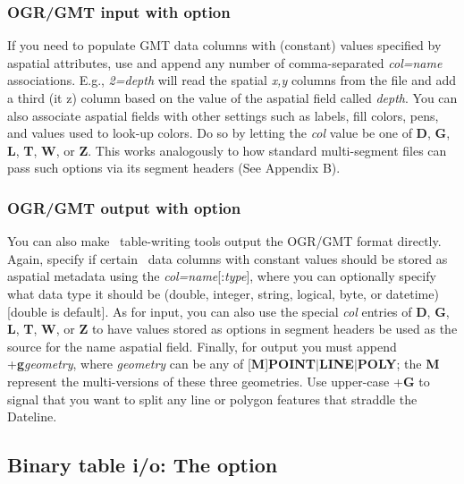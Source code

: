 \subsubsection{OGR/GMT input with  option}
If you need to populate GMT data columns with (constant) values specified by aspatial
attributes, use  and append any number of comma-separated {\it col=name}
associations.  E.g., {\it 2=depth} will read the spatial {\it x,y} columns from the
file and add a third ({it z}) column based on the value of the aspatial field called
{\it depth}.  You can also associate aspatial fields with other settings such as
labels, fill colors, pens, and values used to look-up colors.  Do so by letting
the {\it col} value be one of {\bf D}, {\bf G}, {\bf L}, {\bf T}, {\bf W}, or {\bf Z}.  This
works analogously to how standard multi-segment files can pass such options via
its segment headers (See Appendix B).

\subsubsection{OGR/GMT output with  option}
You can also make \GMT\ table-writing tools output the OGR/GMT format directly.
Again, specify if certain \GMT\ data columns with constant values should be stored
as aspatial metadata using the {\it col=name}[:{\it type}], where you can optionally
specify what data type it should be (double, integer, string, logical, byte, or
datetime) [double is default].  As for input, you can also use the special {\it col}
entries of {\bf D}, {\bf G}, {\bf L}, {\bf T}, {\bf W}, or {\bf Z} to have values stored
as options in segment headers be used as the source for the name aspatial field.
Finally, for output you must append +{\bf g}{\it geometry}, where {\it geometry}
can be any of [{\bf M}]{\bf POINT}$|${\bf LINE}$|${\bf POLY}; the {\bf M} represent
the multi-versions of these three geometries.  Use upper-case +{\bf G} to signal that
you want to split any line or polygon features that straddle the Dateline.

\subsection{Binary table i/o: The  option}


